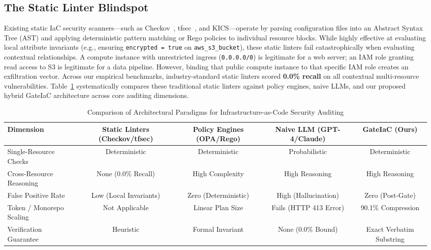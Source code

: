 \documentclass[conference]{IEEEtran}
\begin{document}
\subsection{The Static Linter Blindspot}
Existing static IaC security scanners---such as Checkov~\cite{checkov}, tfsec~\cite{tfsec}, and KICS---operate by parsing configuration files into an Abstract Syntax Tree (AST) and applying deterministic pattern matching or Rego policies to individual resource blocks. While highly effective at evaluating local attribute invariants (e.g., ensuring \texttt{encrypted = true} on \texttt{aws\_s3\_bucket}), these static linters fail catastrophically when evaluating contextual relationships. A compute instance with unrestricted ingress (\texttt{0.0.0.0/0}) is legitimate for a web server; an IAM role granting read access to S3 is legitimate for a data pipeline. However, binding that public compute instance to that specific IAM role creates an exfiltration vector. Across our empirical benchmarks, industry-standard static linters scored \textbf{0.0\% recall} on all contextual multi-resource vulnerabilities. Table~\ref{tab:paradigm_comparison} systematically compares these traditional static linters against policy engines, naive LLMs, and our proposed hybrid GateIaC architecture across core auditing dimensions.

\begin{table}[t]
\centering
\caption{Comparison of Architectural Paradigms for Infrastructure-as-Code Security Auditing}
\label{tab:paradigm_comparison}
\begin{tabular}{lcccc}
\toprule
\textbf{Dimension} & \textbf{Static Linters (Checkov/tfsec)} & \textbf{Policy Engines (OPA/Rego)} & \textbf{Naive LLM (GPT-4/Claude)} & \textbf{GateIaC (Ours)} \\
\midrule
Single-Resource Checks & Deterministic & Deterministic & Probabilistic & Deterministic \\
Cross-Resource Reasoning & None (0.0\% Recall) & High Complexity & High Reasoning & High Reasoning \\
False Positive Rate & Low (Local Invariants) & Zero (Deterministic) & High (Hallucination) & Zero (Post-Gate) \\
Token / Monorepo Scaling & Not Applicable & Linear Plan Size & Fails (HTTP 413 Error) & 90.1\% Compression \\
Verification Guarantee & Heuristic & Formal Invariant & None (0.0\% Bound) & Exact Verbatim Substring \\
\bottomrule
\end{tabular}
\end{table}
\end{document}
